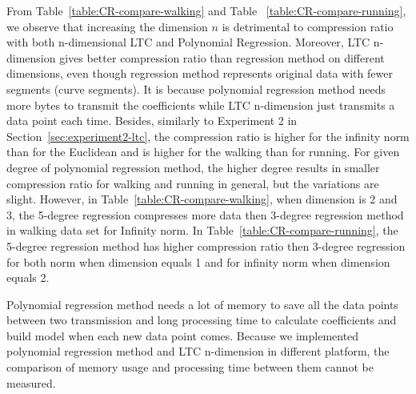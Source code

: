 From Table~\ref{table:CR-compare-walking} and Table
~\ref{table:CR-compare-running}, we observe that increasing the dimension $n$ is
detrimental to compression ratio with both n-dimensional LTC and Polynomial
Regression. Moreover, LTC n-dimension gives better compression ratio than
regression method on different dimensions, even though regression method
represents original data with fewer segments (curve segments). It is because
polynomial regression method needs more bytes to transmit the coefficients while
LTC n-dimension just transmits a data point each time.
Besides, similarly to Experiment 2 in Section~\ref{sec:experiment2-ltc}, the
compression ratio is higher for the infinity norm than for the Euclidean and is
higher for the walking than for running. For given degree of polynomial
regression method, the higher degree results in smaller compression ratio for
walking and running in general, but the variations are slight. However, in
Table~\ref{table:CR-compare-walking}, when dimension is 2 and 3, the 5-degree
regression compresses more data then 3-degree regression method in walking data
set for Infinity norm.  In Table~\ref{table:CR-compare-running}, the 5-degree
regression method has higher compression ratio then 3-degree regression for both
norm when dimension equals 1 and for infinity norm when dimension equals 2.

Polynomial regression method needs a lot of memory to save all the data points
between two transmission and long processing time to calculate coefficients and
build model when each new data point comes. Because we implemented polynomial
regression method and LTC n-dimension in different platform, the comparison of
memory usage and processing time between them cannot be measured.


